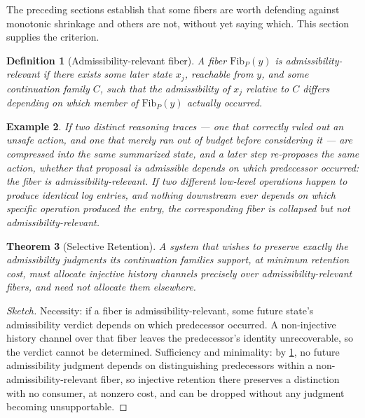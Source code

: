 \documentclass[12pt]{report}
\newtheorem{definition}{Definition}[section]
\newtheorem{theorem}[definition]{Theorem}
\newtheorem{example}[definition]{Example}
\begin{document}
The preceding sections establish that some fibers are worth defending
against monotonic shrinkage and others are not, without yet saying
which. This section supplies the criterion.

\begin{definition}[Admissibility-relevant fiber]
\label{def:admissibility-relevant-appD}
A fiber $\mathrm{Fib}_P(y)$ is admissibility-relevant if there exists
some later state $x_j$, reachable from $y$, and some continuation family
$C$, such that the admissibility of $x_j$ relative to $C$ differs
depending on which member of $\mathrm{Fib}_P(y)$ actually occurred.
\end{definition}

\begin{example}
If two distinct reasoning traces --- one that correctly ruled out an
unsafe action, and one that merely ran out of budget before considering
it --- are compressed into the same summarized state, and a later step
re-proposes the same action, whether that proposal is admissible depends
on which predecessor occurred: the fiber is admissibility-relevant. If
two different low-level operations happen to produce identical log
entries, and nothing downstream ever depends on which specific operation
produced the entry, the corresponding fiber is collapsed but not
admissibility-relevant.
\end{example}

\begin{theorem}[Selective Retention]
\label{thm:selective-retention-appD}
A system that wishes to preserve exactly the admissibility judgments its
continuation families support, at minimum retention cost, must allocate
injective history channels precisely over admissibility-relevant fibers,
and need not allocate them elsewhere.
\end{theorem}

\begin{proof}[Sketch]
Necessity: if a fiber is admissibility-relevant, some future state's
admissibility verdict depends on which predecessor occurred. A
non-injective history channel over that fiber leaves the predecessor's
identity unrecoverable, so the verdict cannot be determined. Sufficiency
and minimality: by \cref{def:admissibility-relevant-appD}, no future
admissibility judgment depends on distinguishing predecessors within a
non-admissibility-relevant fiber, so injective retention there preserves
a distinction with no consumer, at nonzero cost, and can be dropped
without any judgment becoming unsupportable.
\end{proof}
\end{document}
